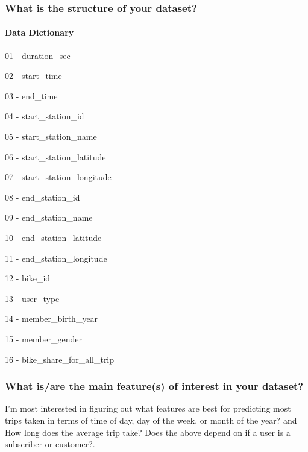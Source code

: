 \documentclass[11pt]{article}
\begin{document}
\hypertarget{what-is-the-structure-of-your-dataset}{%
\subsubsection{What is the structure of your
dataset?}\label{what-is-the-structure-of-your-dataset}}

\hypertarget{data-dictionary}{%
\paragraph{Data Dictionary}\label{data-dictionary}}

01 - duration\_sec

02 - start\_time

03 - end\_time

04 - start\_station\_id

05 - start\_station\_name

06 - start\_station\_latitude

07 - start\_station\_longitude

08 - end\_station\_id

09 - end\_station\_name

10 - end\_station\_latitude

11 - end\_station\_longitude

12 - bike\_id

13 - user\_type

14 - member\_birth\_year

15 - member\_gender

16 - bike\_share\_for\_all\_trip

\hypertarget{what-isare-the-main-features-of-interest-in-your-dataset}{%
\subsubsection{What is/are the main feature(s) of interest in your
dataset?}\label{what-isare-the-main-features-of-interest-in-your-dataset}}

I'm most interested in figuring out what features are best for
predicting most trips taken in terms of time of day, day of the week, or
month of the year? and How long does the average trip take? Does the
above depend on if a user is a subscriber or customer?.
\end{document}
